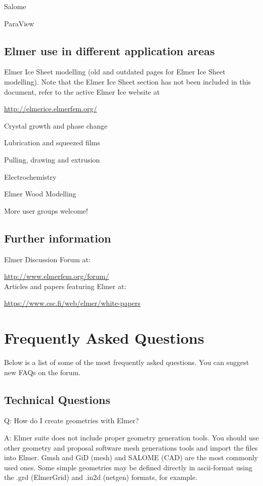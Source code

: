 \noindent Salome

\noindent ParaView

\subsection{Elmer use in different application areas}

\noindent Elmer Ice Sheet modelling (old and outdated pages for Elmer Ice Sheet modelling).  Note that the Elmer Ice Sheet section has not been included in this document, refer to the active Elmer Ice website at

\url{http://elmerice.elmerfem.org/}

\noindent Crystal growth and phase change

\noindent Lubrication and squeezed films

\noindent Pulling, drawing and extrusion

\noindent Electrochemistry

\noindent Elmer Wood Modelling

\noindent More user groups welcome!

\subsection{Further information}

\noindent Elmer Discussion Forum at:

\url{http://www.elmerfem.org/forum/}\\

\noindent Articles and papers featuring Elmer at:

\url{https://www.csc.fi/web/elmer/white-papers}\\

\section{Frequently Asked Questions}

Below is a list of some of the most frequently asked questions. You can suggest new FAQs on the forum.

\subsection{Technical Questions}

    Q: How do I create geometries with Elmer?

    A: Elmer suite does not include proper geometry generation tools. You should use other geometry and proposal software mesh generations tools and import the files into Elmer. Gmsh and GiD (mesh) and SALOME (CAD) are the most commonly used ones. Some simple geometries may be defined directly in ascii-format using the .grd (ElmerGrid) and .in2d (netgen) formats, for example.\\

